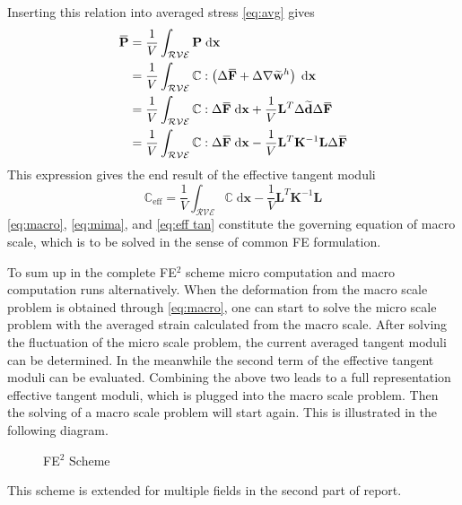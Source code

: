 \documentclass[10pt,a4paper]{scrreprt}
\newcommand{\myd}{\;\mathrm{d}}
\newcommand{\overbar}[1]{\mkern 1.5mu\overline{\mkern-1.5mu#1\mkern-1.5mu}\mkern 1.5mu}
\begin{document}
Inserting this relation into averaged stress \eqref{eq:avg} gives
\begin{equation}
\begin{split}
\overbar{\mathbf{P}} & = \dfrac{1}{V} \int_{\mathcal{RVE}} \mathbf{P} \myd{\mathbf{x}} \\ & = \dfrac{1}{V} \int_{\mathcal{RVE}} \mathbb{C} : \left( \Delta \overbar{\mathbf{F}} + \Delta \nabla{\widetilde{\mathbf{w}}^{h}} \right) \myd{\mathbf{x}} \\
& = \dfrac{1}{V} \int_{\mathcal{RVE}} \mathbb{C} : \Delta \overbar{\mathbf{F}} \myd{\mathbf{x}} + \dfrac{1}{V} \mathbf{L}^{T} \Delta \widetilde{\mathbf{d}} \Delta \overbar{\mathbf{F}}\\
& = \dfrac{1}{V} \int_{\mathcal{RVE}} \mathbb{C} : \Delta \overbar{\mathbf{F}} \myd{\mathbf{x}} - \dfrac{1}{V} \mathbf{L}^{T} \mathbf{K}^{-1} \mathbf{L} \Delta \overbar{\mathbf{F}} 
\end{split}
\end{equation}
This expression gives the end result of the effective tangent moduli
\begin{equation}
\label{eq:eff tan}
\mathbb{C}_{\text{eff}} = \dfrac{1}{V} \int_{\mathcal{RVE}} \mathbb{C} \myd{\mathbf{x}} - \dfrac{1}{V} \mathbf{L}^{T} \mathbf{K}^{-1} \mathbf{L} 
\end{equation}
\eqref{eq:macro}, \eqref{eq:mima}, and \eqref{eq:eff tan} constitute the governing equation of macro scale, which is to be solved in the sense of common FE formulation. 

To sum up in the complete FE$^{2}$ scheme micro computation and macro computation runs alternatively. When the deformation from the macro scale problem is obtained through \eqref{eq:macro}, one can start to solve the micro scale problem with the averaged strain calculated from the macro scale. After solving the fluctuation of the micro scale problem, the current averaged tangent moduli can be determined. In the meanwhile the second term of the effective tangent moduli can be evaluated. Combining the above two leads to a full representation effective tangent moduli, which is plugged into the macro scale problem. Then the solving of a macro scale problem will start again. This is illustrated in the following diagram.

\begin{figure}[h]
\centering
{}
\caption{FE$^{2}$ Scheme}
\end{figure}

This scheme is extended for multiple fields in the second part of report.
\end{document}
